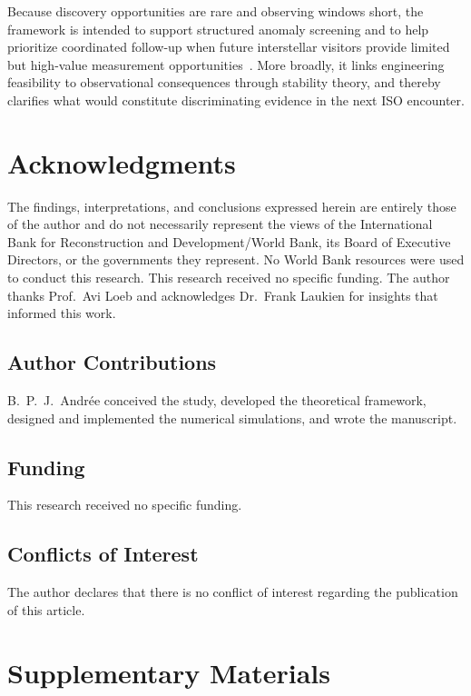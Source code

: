 \documentclass{article}
\begin{document}
Because discovery opportunities are rare and observing windows short, the framework is intended to support structured anomaly screening and to help prioritize coordinated follow-up when future interstellar visitors provide limited but high-value measurement opportunities~\cite{eldadi2025}. More broadly, it links engineering feasibility to observational consequences through stability theory, and thereby clarifies what would constitute discriminating evidence in the next ISO encounter.

\section*{Acknowledgments}

The findings, interpretations, and conclusions expressed herein are entirely those of the author and do not necessarily represent the views of the International Bank for Reconstruction and Development/World Bank, its Board of Executive Directors, or the governments they represent. No World Bank resources were used to conduct this research. This research received no specific funding. The author thanks Prof.\ Avi Loeb and acknowledges Dr.\ Frank Laukien for insights that informed this work.

\subsection*{Author Contributions}
B.~P.~J.~Andr\'ee conceived the study, developed the theoretical framework, designed and implemented the numerical simulations, and wrote the manuscript.

\subsection*{Funding}
This research received no specific funding.

\subsection*{Conflicts of Interest}
The author declares that there is no conflict of interest regarding the publication of this article.

\section*{Supplementary Materials}
\end{document}
